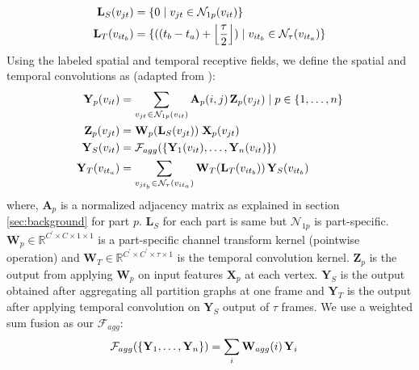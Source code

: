 \documentclass{bmvc2k}
\begin{document}
\small
\begin{align}
    \mathbf{L}_{S}(v_{jt}) &= \{0 \hspace{0.1cm} | \hspace{0.1cm} v_{jt} \in \mathcal{N}_{1p}(v_{it})\} \label{eq:slabel} \\
    \mathbf{L}_{T}(v_{i{t_b}}) &= \{((t_b - t_a) + \left\lfloor \frac{\tau}{2} \right\rfloor) \hspace{0.1cm} | \hspace{0.1cm} v_{i{t_b}} \in \mathcal{N}_{\tau}(v_{i{t_a}})\} \label{eq:tlabel}
\end{align}
\endgroup
Using the labeled spatial and temporal receptive fields, we define the spatial and temporal convolutions as (adapted from \cite{kipf2016semi}):
\begingroup
\small
\begin{align}
    \mathbf{Y}_p(v_{it}) &= \sum_{v_{jt} \hspace{0.02cm} \in \hspace{0.02cm} \mathcal{N}_{1p}(v_{it})}\mathbf{A}_p(i, j) \hspace{0.05cm} \mathbf{Z}_p(v_{jt}) \hspace{0.1cm} | \hspace{0.1cm} p \in \{1,\ldots,n\} \label{eq:sconvpart} \\
    \mathbf{Z}_p(v_{jt}) &= \mathbf{W}_{p}(\mathbf{L}_{S}(v_{jt})) \hspace{0.1cm} \mathbf{X}_p(v_{jt}) \label{eq:xtoz} \\
    \mathbf{Y}_{S}(v_{it}) &= \mathcal{F}_{agg}(\{\mathbf{Y}_1(v_{it}), \ldots, \mathbf{Y}_n(v_{it})\}) \label{eq:sconvfagg} \\
    \mathbf{Y}_{T}(v_{i{t_a}}) &= \sum_{v_{j{t_b}} \hspace{0.02cm} \in \hspace{0.02cm} \mathcal{N}_{\tau}(v_{i{t_a}})} \mathbf{W}_{T}(\mathbf{L}_{T}(v_{i{t_b}})) \hspace{0.05cm} \mathbf{Y}_{S}(v_{i{t_b}}) \label{eq:tconv}
\end{align}
\endgroup
where, $\mathbf{A}_p$ is a normalized adjacency matrix as explained in section \ref{sec:background} for part $p$. $\mathbf{L}_{S}$ for each part is same but $\mathcal{N}_{1p}$ is part-specific. $\mathbf{W}_{p} \in \mathbb{R}^{C^{\prime} \times C \times 1 \times 1}$ is a part-specific channel transform kernel (pointwise operation) and $\mathbf{W}_{T} \in \mathbb{R}^{C^{\prime} \times C^{\prime} \times \tau \times 1}$ is the temporal convolution kernel. $\mathbf{Z}_p$ is the output from applying $\mathbf{W}_p$ on input features $\mathbf{X}_p$ at each vertex. $\mathbf{Y}_{S}$ is the output obtained after aggregating all partition graphs at one frame and $\mathbf{Y}_{T}$ is the output after applying temporal convolution on $\mathbf{Y}_{S}$ output of $\tau$ frames. We use a weighted sum fusion as our $\mathcal{F}_{agg}$:
\begingroup
\small
\begin{align}
    \mathcal{F}_{agg}(\{\mathbf{Y}_1,\ldots,\mathbf{Y}_n\}) &= \sum_{i} \mathbf{W}_{agg}(i) \hspace{0.05cm} \mathbf{Y}_i \label{eq:fagg}
\end{align}
\endgroup
\end{document}
